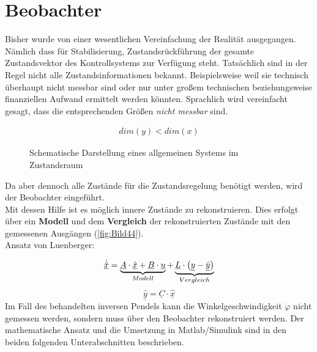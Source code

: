 \section{Beobachter}

Bisher wurde von einer wesentlichen Vereinfachung der Realität ausgegangen. Nämlich dass für Stabilisierung, Zustandsrückführung \etc der gesamte Zustandsvektor des Kontrollsystems zur Verfügung steht. Tatsächlich sind in der Regel nicht alle Zustandsinformationen bekannt. Beispielsweise weil sie technisch überhaupt nicht messbar sind oder nur unter großem technischen beziehungsweise finanziellen Aufwand ermittelt werden könnten. Sprachlich wird
vereinfacht gesagt, dass die entsprechenden Größen \textit{nicht messbar} sind.

\begin{align*}
    dim(y) < dim(x)
\end{align*}

\begin{figure}[H]
    \centering
    \caption[Allgemeines System im Zustandsraum]{Schematische Darstellung eines allgemeinen Systems im Zustandsraum}
    \label{fig:Bild43}
\end{figure}

Da aber dennoch alle Zustände für die Zustandsregelung benötigt werden, wird der Beobachter eingeführt.\\
Mit dessen Hilfe ist es möglich innere Zustände zu rekonstruieren. Dies erfolgt über ein \textbf{Modell} und dem \textbf{Vergleich} der rekonstruierten Zustände mit den gemessenen Ausgängen (\autoref{fig:Bild44}).\\
\newline
Ansatz von Luenberger:

\[
    \underline{\dot{\hat{x}}} = 
    \underbrace{%
        \underline{A} \cdot \underline{\hat{x}} + \underline{B} \cdot \underline{u}
    }_{%
    Modell
    }
    + 
    \underbrace{%
    \underline{L} \cdot\left( \underline{y} - \underline{\hat{y}}\right)
    }_{%
    Vergleich
    }
\]
\[
    \underline{\hat{y}} = \underline{C} \cdot \underline{\hat{x}}
\]
\newline
Im Fall des behandelten inversen Pendels kann die Winkelgeschwindigkeit $\dot{\varphi}$ nicht gemessen werden, sondern muss über den Beobachter rekonstruiert werden. Der mathematische Ansatz und die Umsetzung in Matlab/Simulink sind in den beiden folgenden Unterabschnitten beschrieben.

